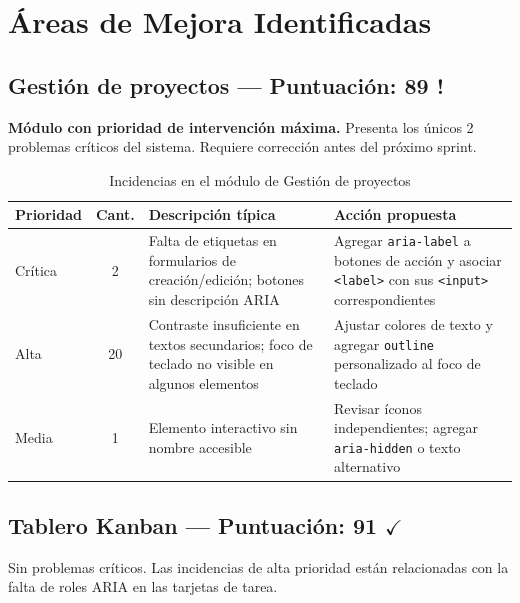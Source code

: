 \documentclass[12pt, a4paper]{article}
\newcommand{\ok}{\textcolor{accentgreen}{$\checkmark$}}
\newcommand{\warn}{\textcolor{accentorange}{\textbf{!}}}
\begin{document}
\section{Áreas de Mejora Identificadas}

\subsection{Gestión de proyectos --- Puntuación: 89 \warn}

\begin{criticobox}
\textbf{Módulo con prioridad de intervención máxima.} Presenta los únicos 2 problemas
críticos del sistema. Requiere corrección antes del próximo sprint.
\end{criticobox}

\vspace{0.5em}

\begin{table}[H]
\centering
\renewcommand{\arraystretch}{1.4}
\begin{tabularx}{\linewidth}{p{1.8cm}cp{4.5cm}X}
\toprule
\rowcolor{lightblue}
\textbf{Prioridad} & \textbf{Cant.} & \textbf{Descripción típica} & \textbf{Acción propuesta} \\
\midrule
\rowcolor{lightred}
Crítica & 2 &
  Falta de etiquetas en formularios de creación/edición; botones sin descripción ARIA &
  Agregar \texttt{aria-label} a botones de acción y asociar \texttt{<label>}
  con sus \texttt{<input>} correspondientes \\
\rowcolor{lightorange}
Alta    & 20 &
  Contraste insuficiente en textos secundarios; foco de teclado no visible en
  algunos elementos &
  Ajustar colores de texto y agregar \texttt{outline} personalizado al foco de teclado \\
Media   & 1  &
  Elemento interactivo sin nombre accesible &
  Revisar íconos independientes; agregar \texttt{aria-hidden} o texto alternativo \\
\bottomrule
\end{tabularx}
\caption{Incidencias en el módulo de Gestión de proyectos}
\end{table}

\subsection{Tablero Kanban --- Puntuación: 91 \ok}

\begin{mejorabox}
Sin problemas críticos. Las incidencias de alta prioridad están relacionadas con la
falta de roles ARIA en las tarjetas de tarea.
\end{mejorabox}
\end{document}
